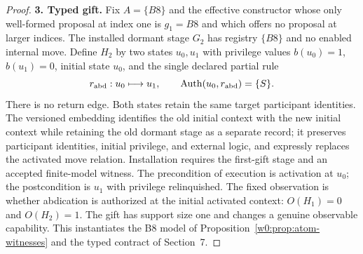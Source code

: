\documentclass[11pt,letterpaper]{article}
\theoremstyle{definition}\newtheorem{definition}[theorem]{Definition}\newtheorem{example}[theorem]{Example}
\theoremstyle{remark}\newtheorem{remark}[theorem]{Remark}
\begin{document}
\begin{proof}
\textbf{3. Typed gift.} Fix $A=\{B8\}$ and the effective constructor whose only well-formed proposal at index one is $g_1=B8$ and which offers no proposal at larger indices. The installed dormant stage $G_2$ has registry $\{B8\}$ and no enabled internal move. Define $H_2$ by two states $u_0,u_1$ with privilege values $b(u_0)=1$, $b(u_1)=0$, initial state $u_0$, and the single declared partial rule
\[
  r_{\rm abd}:u_0\longmapsto u_1,\qquad \mathrm{Auth}(u_0,r_{\rm abd})=\{S\}.
\]
There is no return edge. Both states retain the same target participant identities. The versioned embedding identifies the old initial context with the new initial context while retaining the old dormant stage as a separate record; it preserves participant identities, initial privilege, and external logic, and expressly replaces the activated move relation. Installation requires the first-gift stage and an accepted finite-model witness. The precondition of execution is activation at $u_0$; the postcondition is $u_1$ with privilege relinquished. The fixed observation is whether abdication is authorized at the initial activated context: $O(H_1)=0$ and $O(H_2)=1$. The gift has support size one and changes a genuine observable capability. This instantiates the B8 model of Proposition~\ref{w0:prop:atom-witnesses} and the typed contract of Section~7.


\end{proof}
\end{document}
